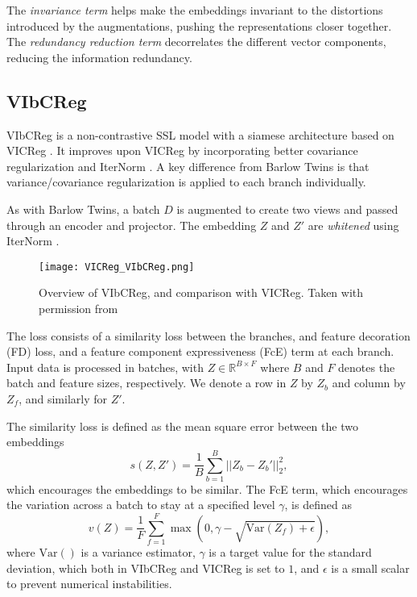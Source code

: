 \documentclass[../../thesis.tex]{subfiles}
\begin{document}
The \textit{invariance term} helps make the embeddings invariant to the distortions introduced by the augmentations, pushing the representations closer together. The \textit{redundancy reduction term} decorrelates the different vector components, reducing the information redundancy.\newline

\subsection{VIbCReg}

VIbCReg \cite{lee2024vibcreg} is a non-contrastive SSL model with a siamese architecture based on VICReg \cite{bardes2022vicreg}. It improves upon VICReg by incorporating better covariance regularization and IterNorm \cite{huang2019iterative}. A key difference from Barlow Twins is that variance/covariance regularization is applied to each branch individually.\newline

As with Barlow Twins, a batch $D$ is augmented to create two views and passed through an encoder and projector. The embedding $Z$ and $Z'$ are \textit{whitened} using IterNorm \cite{huang2019iterative}.\newline

\begin{figure}[h]
    \texttt{[image: VICReg\_VIbCReg.png]}
    \centering    
    \caption{Overview of VIbCReg, and comparison with VICReg. Taken with permission from \cite{lee2024computer}}
    \label{fig:VIbCReg}
\end{figure}

The loss consists of a similarity loss between the branches, and feature decoration (FD) loss, and a feature component expressiveness (FcE) term at each branch. Input data is processed in batches, with $Z \in \mathbb{R}^{B\times F}$ where $B$ and $F$ denotes the batch and feature sizes, respectively. We denote a row in $Z$ by $Z_b$ and column by $Z_f$, and similarly for $Z'$.\newline

The similarity loss is defined as the mean square error between the two embeddings
\begin{equation}
    s(Z,Z') = \frac{1}{B} \sum_{b=1}^B || Z_b-Z_b'||_2^2,
\end{equation}
which encourages the embeddings to be similar. The FcE term, which encourages the variation across a batch to stay at a specified level $\gamma$, is defined as 
\begin{equation}
    v(Z) =  \frac{1}{F} \sum_{f=1}^F \max(0,\gamma - \sqrt{\text{Var}(Z_f)+\epsilon}),
\end{equation}
where $\text{Var}()$ is a variance estimator, $\gamma$ is a target value for the standard deviation, which both in VIbCReg and VICReg is set to $1$, and $\epsilon$ is a small scalar to prevent numerical instabilities. 
\newline 
\end{document}
